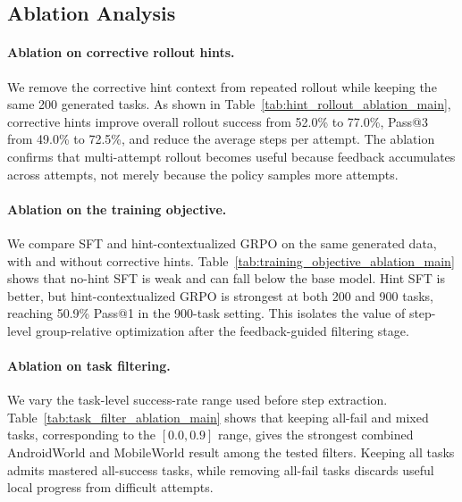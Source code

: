 \subsection{Ablation Analysis}



\paragraph{Ablation on corrective rollout hints.}
We remove the corrective hint context from repeated rollout while keeping the same 200 generated tasks. As shown in Table~\ref{tab:hint_rollout_ablation_main}, corrective hints improve overall rollout success from 52.0\% to 77.0\%, Pass@3 from 49.0\% to 72.5\%, and reduce the average steps per attempt. The ablation confirms that multi-attempt rollout becomes useful because feedback accumulates across attempts, not merely because the policy samples more attempts.



\paragraph{Ablation on the training objective.}
We compare SFT and hint-contextualized GRPO on the same generated data, with and without corrective hints. Table~\ref{tab:training_objective_ablation_main} shows that no-hint SFT is weak and can fall below the base model. Hint SFT is better, but hint-contextualized GRPO is strongest at both 200 and 900 tasks, reaching 50.9\% Pass@1 in the 900-task setting. This isolates the value of step-level group-relative optimization after the feedback-guided filtering stage.



\paragraph{Ablation on task filtering.}
We vary the task-level success-rate range used before step extraction. Table~\ref{tab:task_filter_ablation_main} shows that keeping all-fail and mixed tasks, corresponding to the $[0.0,0.9]$ range, gives the strongest combined AndroidWorld and MobileWorld result among the tested filters. Keeping all tasks admits mastered all-success tasks, while removing all-fail tasks discards useful local progress from difficult attempts.

